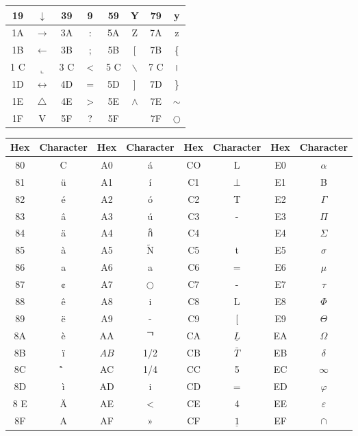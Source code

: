\documentclass[10pt]{article}
\begin{document}
\begin{center}
\begin{tabular}{|c|c|c|c|c|c|c|c|}
\hline
19 & $\downarrow$ & 39 & 9 & 59 & Y & 79 & y \\
\hline
1A & $\rightarrow$ & 3A & : & 5A & Z & 7A & z \\
\hline
1B & $\leftarrow$ & 3B & ; & 5B & [ & 7B & \{ \\
\hline
1 C & $\llcorner$ & 3 C & < & 5 C & $\backslash$ & 7 C & । \\
\hline
1D & $\leftrightarrow$ & 4D & $=$ & 5D & ] & 7D & \} \\
\hline
1E & $\triangle$ & 4E & > & 5E & $\wedge$ & 7E & $\sim$ \\
\hline
1F & V & 5F & ? & 5F &  & 7F & $\bigcirc$ \\
\hline
\end{tabular}
\end{center}

\begin{center}
\begin{tabular}{|c|c|c|c|c|c|c|c|}
\hline
Hex & Character & Hex & Character & Hex & Character & Hex & Character \\
\hline
80 & C & A0 & á & CO & L & E0 & $\alpha$ \\
\hline
81 & ü & A1 & í & C1 & $\perp$ & E1 & B \\
\hline
82 & é & A2 & ó & C2 & T & E2 & $\Gamma$ \\
\hline
83 & â & A3 & ú & C3 & - & E3 & $\Pi$ \\
\hline
84 & ä & A4 & กิ & C4 &  & E4 & $\Sigma$ \\
\hline
85 & à & A5 & $\tilde{\mathrm{N}}$ & C5 & t & E5 & $\sigma$ \\
\hline
86 & a & A6 & a & C6 & $=$ & E6 & $\mu$ \\
\hline
87 & ¢ & A7 & $\bigcirc$ & C7 & - & E7 & $\tau$ \\
\hline
88 & ê & A8 & i & C8 & L & E8 & $\Phi$ \\
\hline
89 & ë & A9 & - & C9 & [ & E9 & $\Theta$ \\
\hline
8A & è & AA & ᄀ & CA & $\underline{L}$ & EA & $\Omega$ \\
\hline
8B & ï & $A B$ & 1/2 & CB & $\bar{T}$ & EB & $\delta$ \\
\hline
8C & ̂̀ & AC & 1/4 & CC & 5 & EC & $\infty$ \\
\hline
8D & ì & AD & i & CD & $=$ & ED & $\varphi$ \\
\hline
8 E & Ä & AE & < & CE & 4 & EE & $\varepsilon$ \\
\hline
8F & A & AF & » & CF & $\underline{1}$ & EF & $\cap$ \\

\end{tabular}
\end{center}
\end{document}
